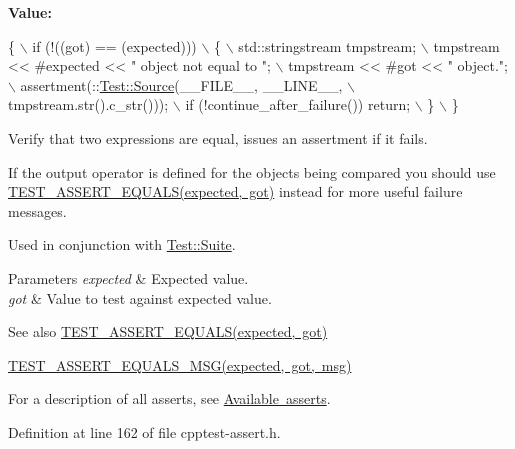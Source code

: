 {\bfseries Value\+:}
\begin{DoxyCode}
\{                                                               \(\backslash\)
        if (!((got) == (expected)))                                 \(\backslash\)
        \{                                                           \(\backslash\)
            std::stringstream tmpstream;                            \(\backslash\)
            tmpstream << #expected << \textcolor{stringliteral}{" object not equal to "};      \(\backslash\)
            tmpstream << #got << \textcolor{stringliteral}{" object."};                        \(\backslash\)
            assertment(::\mbox{\hyperlink{class_test_1_1_source}{Test::Source}}(\_\_FILE\_\_, \_\_LINE\_\_,           \(\backslash\)
                        tmpstream.str().c\_str()));                  \(\backslash\)
            if (!continue\_after\_failure()) return;                  \(\backslash\)
        \}                                                           \(\backslash\)
    \}
\end{DoxyCode}
Verify that two expressions are equal, issues an assertment if it fails.

If the output operator is defined for the objects being compared you should use \mbox{\hyperlink{cpptest-assert_8h_ae281f4d973e657b11691a97551f17dd1}{T\+E\+S\+T\+\_\+\+A\+S\+S\+E\+R\+T\+\_\+\+E\+Q\+U\+A\+L\+S(expected, got)}} instead for more useful failure messages.

Used in conjunction with \mbox{\hyperlink{class_test_1_1_suite}{Test\+::\+Suite}}.


\begin{DoxyParams}{Parameters}
{\em expected} & Expected value. \\
\hline
{\em got} & Value to test against expected value.\\
\hline
\end{DoxyParams}
\begin{DoxySeeAlso}{See also}
\mbox{\hyperlink{cpptest-assert_8h_ae281f4d973e657b11691a97551f17dd1}{T\+E\+S\+T\+\_\+\+A\+S\+S\+E\+R\+T\+\_\+\+E\+Q\+U\+A\+L\+S(expected, got)}} 

\mbox{\hyperlink{cpptest-assert_8h_ab8e9ce729f96abe74b76d98f9568a59c}{T\+E\+S\+T\+\_\+\+A\+S\+S\+E\+R\+T\+\_\+\+E\+Q\+U\+A\+L\+S\+\_\+\+M\+S\+G(expected, got, msg)}}
\end{DoxySeeAlso}
For a description of all asserts, see \mbox{\hyperlink{asserts}{Available asserts}}. 

Definition at line 162 of file cpptest-\/assert.\+h.

